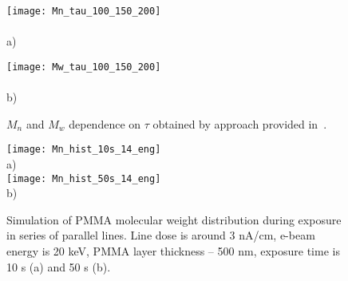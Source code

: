 \begin{figure}
	\begin{minipage}{0.48\textwidth}
		\texttt{[image: Mn\_tau\_100\_150\_200]} \\
		\vspace{-14em} \\ \hspace{0em} a) \\ \vspace{14em}
	\end{minipage}
	\begin{minipage}{0.48\textwidth}
		\texttt{[image: Mw\_tau\_100\_150\_200]} \\
		\vspace{-14em} \\ \hspace{-0.1em} b) \\ \vspace{14em}
	\end{minipage}
	\vspace{-4em}
	\caption{$M_n$ and $M_w$ dependence on $\tau$ obtained by approach provided in~\cite{Boyd_3}.}
	\label{fig:Mn_Mw_tau}
\end{figure}

\begin{figure}[h]
	\begin{center}
		\texttt{[image: Mn\_hist\_10s\_14\_eng]} \\
		\vspace{-3.7em} \hspace{-26em} a) \vspace{2.7em} \\
		\texttt{[image: Mn\_hist\_50s\_14\_eng]} \\
		\vspace{-3.7em} \hspace{-26em} b) \vspace{3.7em} \\
	\end{center}
	\vspace{-2.5em}
	\caption{Simulation of PMMA molecular weight distribution during exposure in series of parallel lines. Line dose is around 3 nA/cm, e-beam energy is 20 keV, PMMA layer thickness -- 500 nm, exposure time is 10 s (a) and  50 s (b).}
	\label{fig:Mn_hist}
\end{figure}
